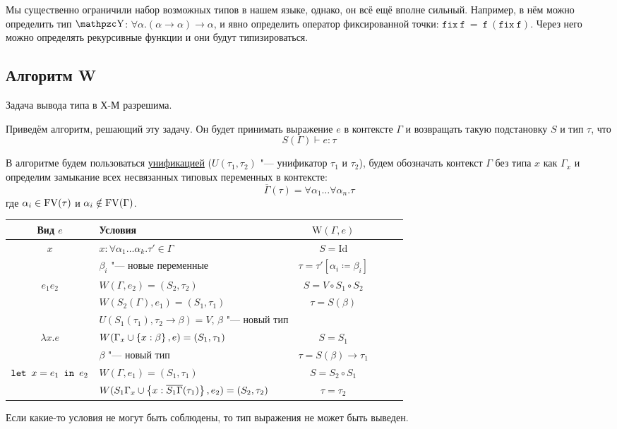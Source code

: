 Мы существенно ограничили набор возможных типов в нашем языке, однако, он всё ещё вполне сильный.
Например, в нём можно определить тип $\comb Y$: $\forall \alpha . (\alpha\rightarrow\alpha)\rightarrow\alpha$,
и явно определить оператор фиксированной точки: $\mathtt{fix~f~=~f~(fix~f)}$.
Через него можно определять рекурсивные функции и они будут типизироваться.

\subsection{\texorpdfstring{Алгоритм W}{Algorithm W}}
\begin{statement}
    Задача вывода типа в Х-М разрешима.
\end{statement}
Приведём алгоритм, решающий эту задачу.
Он будет принимать выражение $e$ в контексте $\Gamma$ и возвращать такую подстановку $S$ и тип $\tau$, что
\[
    S(\Gamma) \vdash e : \tau
\]

В алгоритме будем пользоваться \hyperref[unificator]{унификацией} ($U(\tau_1, \tau_2)$ "--- унификатор $\tau_1$ и $\tau_2$),
будем обозначать контекст $\Gamma$ без типа $x$ как $\Gamma_x$
и определим замыкание всех несвязанных типовых переменных в контексте:
\[
    \overline{\Gamma}(\tau) = \forall \alpha_1 \ldots \forall \alpha_n . \tau
\]
где $\alpha_i \in \operatorname{FV}(\tau)$ и $\alpha_i \notin \operatorname{FV}(\Gamma)$.

\begin{center}
\begin{tabular}{Sl Sl Sl} \toprule
    Вид $e$ & Условия & $\mathrm{W}(\Gamma, e)$ \\ \toprule
    $x$
        & $x : \forall \alpha_1 \ldots \alpha_k . \tau' \in \Gamma$ & $S =\mathrm{Id}$ \\
        & $\beta_i$ "--- новые переменные                           & $\tau = \tau'[\alpha_i \coloneqq \beta_i]$ \\
        \midrule
    $e_1 e_2$
            & $W(\Gamma, e_2) = (S_2, \tau_2)$                                       & $S = V \circ S_1 \circ S_2$ \\
            & $W(S_2(\Gamma), e_1) = (S_1, \tau_1)$                                  & $\tau = S(\beta)$ \\
            & $U(S_1(\tau_1), \tau_2 \rightarrow \beta) = V$, $\beta$ "--- новый тип & \\ \midrule
    $\lambda x . e$
        & $W(\Gamma_x \cup \left\{x : \beta\right\}, e) = (S_1, \tau_1)$ & $S = S_1$  \\
        & $\beta$ "--- новый тип                                & $\tau = S(\beta) \rightarrow \tau_1$ \\ \midrule
    $\mathinner{\mathtt{let}}~x=e_1~\mathinner{\mathtt{in}}~e_2$
        & $W(\Gamma, e_1) = (S_1, \tau_1)$                                                     & $S = S_2 \circ S_1$ \\
        & $W(S_1 \Gamma_x \cup \left\{x : \overline{S_1 \Gamma} (\tau_1)\right\}, e_2) = (S_2, \tau_2)$ & $\tau = \tau_2$ \\ \bottomrule
\end{tabular}
\end{center}

Если какие-то условия не могут быть соблюдены, то тип выражения не может быть выведен.

\begin{example}
\todo
\end{example}
